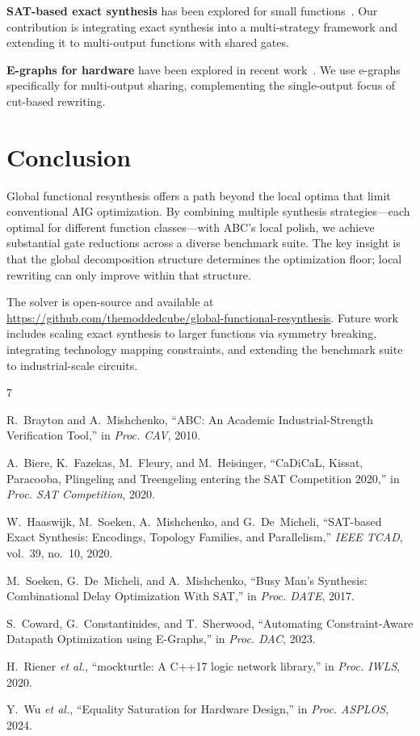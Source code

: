 \documentclass[conference,10pt]{IEEEtran}
\begin{document}
\textbf{SAT-based exact synthesis} has been explored for small functions~\cite{haaswijk2020, soeken2017}. Our contribution is integrating exact synthesis into a multi-strategy framework and extending it to multi-output functions with shared gates.

\textbf{E-graphs for hardware} have been explored in recent work~\cite{egraph_dac, egraph_asplos}. We use e-graphs specifically for multi-output sharing, complementing the single-output focus of cut-based rewriting.

\section{Conclusion}

Global functional resynthesis offers a path beyond the local optima that limit conventional AIG optimization. By combining multiple synthesis strategies---each optimal for different function classes---with ABC's local polish, we achieve substantial gate reductions across a diverse benchmark suite. The key insight is that the global decomposition structure determines the optimization floor; local rewriting can only improve within that structure.

The solver is open-source and available at \url{https://github.com/themoddedcube/global-functional-resynthesis}. Future work includes scaling exact synthesis to larger functions via symmetry breaking, integrating technology mapping constraints, and extending the benchmark suite to industrial-scale circuits.

\balance

\begin{thebibliography}{7}

R.~Brayton and A.~Mishchenko, ``ABC: An Academic Industrial-Strength Verification Tool,'' in \emph{Proc. CAV}, 2010.

A.~Biere, K.~Fazekas, M.~Fleury, and M.~Heisinger, ``CaDiCaL, Kissat, Paracooba, Plingeling and Treengeling entering the SAT Competition 2020,'' in \emph{Proc. SAT Competition}, 2020.

W.~Haaswijk, M.~Soeken, A.~Mishchenko, and G.~De~Micheli, ``SAT-based Exact Synthesis: Encodings, Topology Families, and Parallelism,'' \emph{IEEE TCAD}, vol.~39, no.~10, 2020.

M.~Soeken, G.~De~Micheli, and A.~Mishchenko, ``Busy Man's Synthesis: Combinational Delay Optimization With SAT,'' in \emph{Proc. DATE}, 2017.

S.~Coward, G.~Constantinides, and T.~Sherwood, ``Automating Constraint-Aware Datapath Optimization using E-Graphs,'' in \emph{Proc. DAC}, 2023.

H.~Riener \emph{et al.}, ``mockturtle: A C++17 logic network library,'' in \emph{Proc. IWLS}, 2020.

Y.~Wu \emph{et al.}, ``Equality Saturation for Hardware Design,'' in \emph{Proc. ASPLOS}, 2024.

\end{thebibliography}
\end{document}
